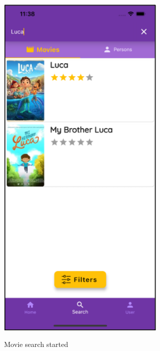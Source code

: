 \documentclass[12pt, a4paper]{article}
\numberwithin{figure}{section}
\begin{document}
\begin{center}
	\begin{minipage}[t]{0.31\textwidth}
		\begin{figure}[H]
			\centering
			\includegraphics[width=0.71\textwidth]{images/final/searchMovie.png}\\
			\caption{Movie search started}
		\end{figure}
	\end{minipage}
	\hspace{0.015\linewidth}
	\begin{minipage}[t]{0.31\textwidth}
		\begin{figure}[H]
			\centering

\end{figure}
\end{minipage}
\end{center}
\end{document}
